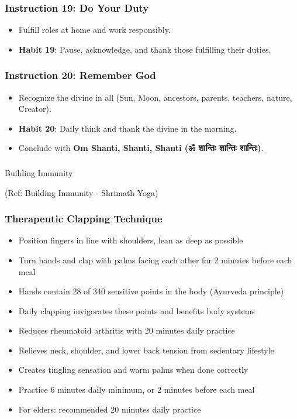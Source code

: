 \begin{frame}[fragile]\frametitle{Instruction 19: Do Your Duty}
      \begin{itemize}
          \item Fulfill roles at home and work responsibly.
          \item \textbf{Habit 19}: Pause, acknowledge, and thank those fulfilling their duties.
      \end{itemize}
\end{frame}

\begin{frame}[fragile]\frametitle{Instruction 20: Remember God}
      \begin{itemize}
          \item Recognize the divine in all (Sun, Moon, ancestors, parents, teachers, nature, Creator).
          \item \textbf{Habit 20}: Daily think and thank the divine in the morning.
          \item Conclude with \textbf{Om Shanti, Shanti, Shanti (ॐ शान्तिः शान्तिः शान्तिः)}.
      \end{itemize}
\end{frame}


\begin{frame}[fragile]\frametitle{}
\begin{center}
{\Large Building Immunity}
\end{center}

{\tiny (Ref:  Building Immunity - Shrimath Yoga)}

\end{frame}

\begin{frame}[fragile]\frametitle{Therapeutic Clapping Technique}
      \begin{itemize}
	\item Position fingers in line with shoulders, lean as deep as possible
	\item Turn hands and clap with palms facing each other for 2 minutes before each meal
	\item Hands contain 28 of 340 sensitive points in the body (Ayurveda principle)
	\item Daily clapping invigorates these points and benefits body systems
	\item Reduces rheumatoid arthritis with 20 minutes daily practice
	\item Relieves neck, shoulder, and lower back tension from sedentary lifestyle
	\item Creates tingling sensation and warm palms when done correctly
	\item Practice 6 minutes daily minimum, or 2 minutes before each meal
	\item For elders: recommended 20 minutes daily practice
	  \end{itemize}
\end{frame}

